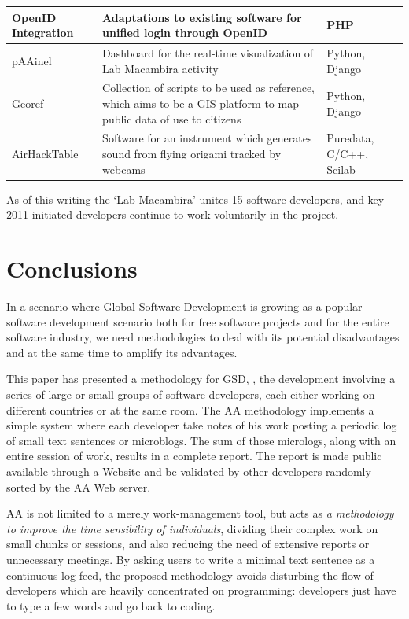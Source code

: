 \documentclass[letterpaper]{article}
\begin{document}
\begin{table}
\begin{tabular}{|l|p{5cm}|l|}
        \hline
        OpenID Integration & Adaptations to existing software for
        unified login through OpenID & PHP \\
        \hline
        pAAinel & Dashboard for the real-time visualization of Lab
        Macambira activity & Python, Django \\
        \hline
        Georef & Collection of scripts to be used as reference, which
        aims to be a GIS platform to map public data of use to
        citizens & Python, Django \\
        \hline
        AirHackTable & Software for an instrument which generates
        sound from flying origami tracked by webcams & Puredata,
        C/C++, Scilab \\
        \hline
        \end{tabular}
    \label{tabela:criados}
\end{table}

As of this writing the `Lab Macambira' unites 15 software developers, and 
key 2011-initiated developers continue to work voluntarily in the project.

\section{Conclusions}
\label{conclusions}

In a scenario where Global Software Development is growing as a popular 
software development scenario both for free software projects and for the entire
software industry, we need methodologies to deal with its potential disadvantages and at
the same time to amplify its advantages.

This paper has presented a methodology for GSD, \ie, the development
involving a series of large or small groups of software developers, each either working on
different countries or at the same room. The AA methodology
implements a simple system where each developer take notes of his work
posting a periodic log of small text sentences or microblogs. The sum of those
micrologs, along with an entire session of work, results in a complete
report. The report is made public available through a Website and be
validated by other developers randomly sorted by the AA Web server.

AA is not limited to a merely work-management tool, but acts as \emph{a
methodology to improve the time sensibility of individuals}, dividing their
complex work on small chunks or sessions, and also reducing the need of extensive
reports or unnecessary meetings. By asking users to write a minimal
text sentence as a continuous log feed, the proposed methodology avoids
disturbing the flow of developers which are heavily concentrated on programming: developers
just have to type a few words and go back to coding.
\end{document}

